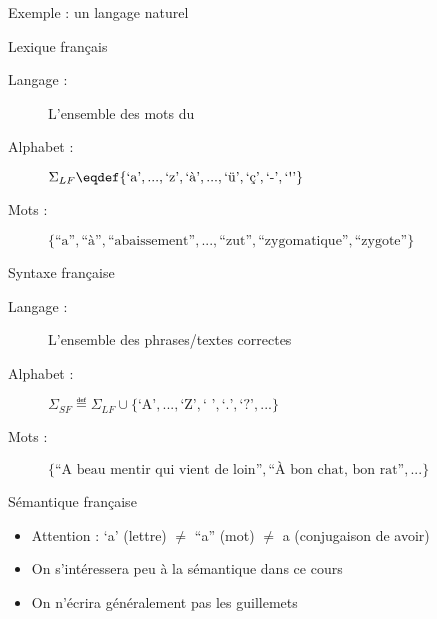 
\begingroup

\begin{frame}{Exemple : un langage naturel}

  \begin{block}{Lexique français}
    \begin{description}
    \item[Langage :] L'ensemble des mots du 
    \item[Alphabet :] $\Sigma_{LF} \eqdef \{\text{`a'}, ...,  \text{`z'}, \text{`à'}, ..., \text{`ü'}, \text{`ç'}, \text{`-'}, \text{`\textquotesingle'}\}$
    \item[Mots :] $\{\text{``a''}, \text{``à''}, \text{``abaissement''}, ..., \text{``zut''}, \text{``zygomatique''}, \text{``zygote''}\}$
    \end{description}
  \end{block}
  
  \pause
  \begin{block}{Syntaxe française}
    \begin{description}
    \item[Langage :] L'ensemble des phrases/textes  correctes
    \item[Alphabet :] $\Sigma_{SF} \eqdef \Sigma_{LF} \cup \{\text{`A'}, ..., \text{`Z'}, \text{`~'}, \text{`.'}, \text{`?'}, ...\}$
    \item[Mots :] $\{\text{``A beau mentir qui vient de loin''}, \text{``À bon chat, bon rat''}, ...\}$
    \end{description}
  \end{block}
  
  \pause
  \begin{alertblock}{Sémantique française}
    \begin{itemize}
    \item \alert{Attention :} `a' (lettre) $\neq$ ``a'' (mot) $\neq$ a (conjugaison de avoir)
    \item On s'intéressera peu à la sémantique dans ce cours
    \item On n'écrira généralement pas les guillemets
    \end{itemize}
  \end{alertblock}

\end{frame}

\endgroup
